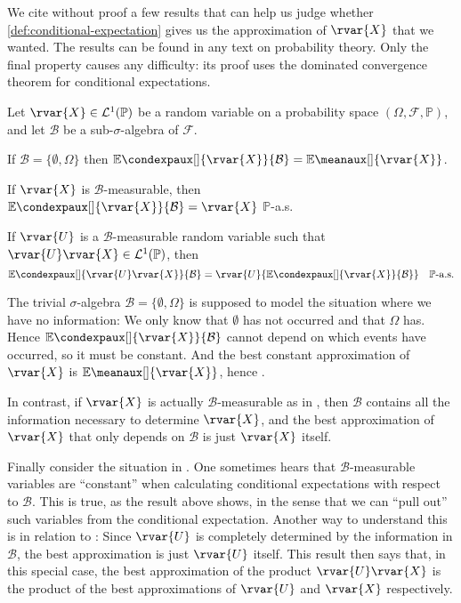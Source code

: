 \documentclass[article, a4paper, 11pt, oneside]{memoir}
\numberwithin{equation}{chapter}
\newcommand{\calB}{\mathcal{B}}
\newcommand{\calF}{\mathcal{F}}
\newcommand{\calL}{\mathcal{L}}
\renewcommand{\P}{\mathbb{P}}
\renewcommand{\mean}[2][]{\mathbb{E}\meanaux[#1]{#2}}
\newcommand{\condexp}[3][]{{\mathbb{E}\condexpaux[#1]{#2}{#3}}}
\begin{document}
We cite without proof a few results that can help us judge whether \cref{def:conditional-expectation} gives us the approximation of $\rvar{X}$ that we wanted. The results can be found in any text on probability theory. Only the final property causes any difficulty: its proof uses the dominated convergence theorem for conditional expectations.

\begin{proposition}
    Let $\rvar{X} \in \calL^1(\P)$ be a random variable on a probability space $(\Omega, \calF, \P)$, and let $\calB$ be a sub-$\sigma$-algebra of $\calF$.
    \begin{enumprop}
        \item \label{enum:conditional-expectation-no-information} If $\calB = \{\emptyset, \Omega\}$ then $\condexp{\rvar{X}}{\calB} = \mean{\rvar{X}}$.

        \item \label{enum:conditional-expectation-all-information} If $\rvar{X}$ is $\calB$-measurable, then $\condexp{\rvar{X}}{\calB} = \rvar{X}$ $\P$-a.s.

        \item \label{enum:conditional-expectation-constant} If $\rvar{U}$ is a $\calB$-measurable random variable such that $\rvar{U}\rvar{X} \in \calL^1(\P)$, then
        \begin{equation*}
            \condexp{\rvar{U}\rvar{X}}{\calB}
                = \rvar{U} \condexp{\rvar{X}}{\calB}
                \quad \text{$\P$-a.s.}
        \end{equation*}
    \end{enumprop}
\end{proposition}
%
The trivial $\sigma$-algebra $\calB = \{\emptyset, \Omega\}$ is supposed to model the situation where we have no information: We only know that $\emptyset$ has not occurred and that $\Omega$ has. Hence $\condexp{\rvar{X}}{\calB}$ cannot depend on which events have occurred, so it must be constant. And the best constant approximation of $\rvar{X}$ is $\mean{\rvar{X}}$, hence .

In contrast, if $\rvar{X}$ is actually $\calB$-measurable as in , then $\calB$ contains all the information necessary to determine $\rvar{X}$, and the best approximation of $\rvar{X}$ that only depends on $\calB$ is just $\rvar{X}$ itself.

Finally consider the situation in . One sometimes hears that $\calB$-measurable variables are \enquote{constant} when calculating conditional expectations with respect to $\calB$. This is true, as the result above shows, in the sense that we can \enquote{pull out} such variables from the conditional expectation. Another way to understand this is in relation to : Since $\rvar{U}$ is completely determined by the information in $\calB$, the best approximation is just $\rvar{U}$ itself. This result then says that, in this special case, the best approximation of the product $\rvar{U}\rvar{X}$ is the product of the best approximations of $\rvar{U}$ and $\rvar{X}$ respectively.
\end{document}
